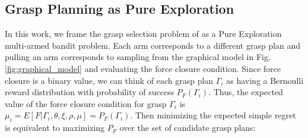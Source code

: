 \documentclass[journal,transmag]{IEEEtran}%
\begin{document}
%
%
%

\subsection{Grasp Planning as Pure Exploration}
In this work, we frame the grasp selection problem of  as a Pure Exploration multi-armed bandit problem.
Each arm corresponds to a different grasp plan and pulling an arm corresponds to sampling from the graphical model in Fig. \ref{fig:graphical_model} and evaluating the force closure condition.
Since force closure is a binary value, we can think of each grasp plan $\Gamma_i$ as having a Bernoulli reward distribution with probability of success $P_F(\Gamma_i)$.
Thus, the expected value of the force closure condition for grasp $\Gamma_i$ is $\mu_i = E[F | \Gamma_i, \theta, \xi, \rho, \mu] = P_F(\Gamma_i)$.
Then minimizing the expected simple regret is equivalent to maximizing $P_F$ over the set of candidate grasp plans:
\end{document}
